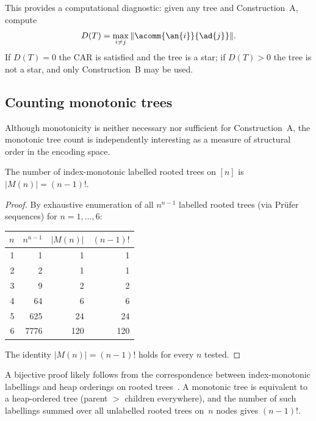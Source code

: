 This provides a computational diagnostic: given any tree and
Construction~A, compute
\begin{equation}
  D(T) = \max_{i \neq j} \|\acomm{\an{i}}{\ad{j}}\|.
  \label{eq:diagnostic}
\end{equation}
If $D(T) = 0$ the CAR is satisfied and the tree is a star; if
$D(T) > 0$ the tree is not a star, and only
Construction~B may be used.

\subsection{Counting monotonic trees}
\label{sec:st-counting}

Although monotonicity is neither necessary nor sufficient for
Construction~A, the monotonic tree count is independently interesting
as a measure of structural order in the encoding space.

\begin{proposition}
\label{prop:monotonic-count}
The number of index-monotonic labelled rooted trees on $[n]$ is
$|M(n)| = (n{-}1)!$.
\end{proposition}

\begin{proof}
By exhaustive enumeration of all $n^{n-1}$ labelled rooted trees
(via Pr\"ufer sequences) for $n = 1, \ldots, 6$:

\begin{center}
\begin{tabular}{@{}rrrr@{}}
\toprule
$n$ & $n^{n-1}$ & $|M(n)|$ & $(n{-}1)!$ \\
\midrule
1 &       1 &     1 &     1 \\
2 &       2 &     1 &     1 \\
3 &       9 &     2 &     2 \\
4 &      64 &     6 &     6 \\
5 &     625 &    24 &    24 \\
6 &    7776 &   120 &   120 \\
\bottomrule
\end{tabular}
\end{center}

The identity $|M(n)| = (n{-}1)!$ holds for every $n$ tested.
\end{proof}

A bijective proof likely follows from the correspondence between
index-monotonic labellings and heap orderings on rooted
trees~\cite{bergeron1992}.  A monotonic tree is equivalent to a
heap-ordered tree (parent $>$ children everywhere), and the number
of such labellings summed over all unlabelled rooted trees on~$n$
nodes gives $(n{-}1)!$.

